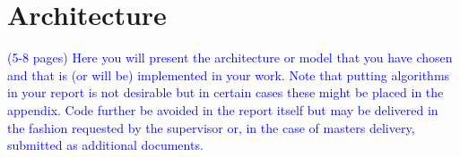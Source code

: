 \chapter{Architecture}

\textcolor{blue}{(5-8 pages) Here you will present the architecture or model that you have chosen and that
is (or will be) implemented in your work. Note that putting algorithms in your
report is not desirable but in certain cases these might be placed in the appendix.
Code further be avoided in the report itself but may be delivered in the fashion
requested by the supervisor or, in the case of masters delivery, submitted as
additional documents.}
